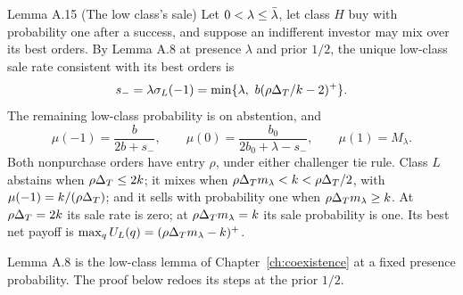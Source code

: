 \begin{paperresult}{Lemma A.15 (The low class's sale)}
Let \(0<\lambda\le\bar\lambda\), let class \(H\) buy with probability one after a success, and suppose an indifferent investor
may mix over its best orders. By Lemma A.8 at presence \(\lambda\) and prior \(1/2\), the unique low-class sale rate
consistent with its best orders is
\[
s_-=\lambda\sigma_L(-1)=\min\{\lambda,\ b(\rho\DT/k-2)^+\}.
\]
The remaining low-class probability is on abstention, and
\[
\mu(-1)=\frac{b}{2b+s_-},\qquad \mu(0)=\frac{b_0}{2b_0+\lambda-s_-},\qquad \mu(1)=M_\lambda.
\]
Both nonpurchase orders have entry \(\rho\), under either challenger tie rule. Class \(L\) abstains when
\(\rho\Delta_T\le2k\); it mixes when \(\rho\Delta_T m_\lambda<k<\rho\Delta_T/2\), with \(\mu(-1)=k/(\rho\Delta_T)\); and it sells with
probability one when \(\rho\Delta_T m_\lambda\ge k\). At \(\rho\Delta_T=2k\) its sale rate is zero; at \(\rho\Delta_T m_\lambda=k\)
its sale probability is one. Its best net payoff is \(\max_qU_L(q)=(\rho\Delta_T m_\lambda-k)^+\).
\end{paperresult}

Lemma A.8 is the low-class lemma of Chapter~\ref{ch:coexistence} at a fixed presence probability. The proof below
redoes its steps at the prior \(1/2\).

